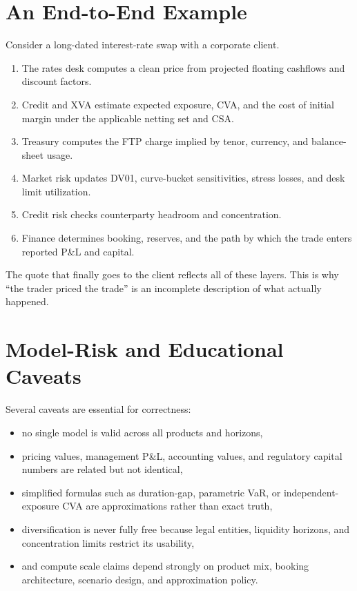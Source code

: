 \documentclass{apex_mdd}
\begin{document}
\section{An End-to-End Example}

Consider a long-dated interest-rate swap with a corporate client.
\begin{enumerate}
  \item The rates desk computes a clean price from projected floating cashflows and discount factors.
  \item Credit and XVA estimate expected exposure, CVA, and the cost of initial margin under the applicable netting set and CSA.
  \item Treasury computes the FTP charge implied by tenor, currency, and balance-sheet usage.
  \item Market risk updates DV01, curve-bucket sensitivities, stress losses, and desk limit utilization.
  \item Credit risk checks counterparty headroom and concentration.
  \item Finance determines booking, reserves, and the path by which the trade enters reported P\&L and capital.
\end{enumerate}

The quote that finally goes to the client reflects all of these layers. This is why ``the trader priced the trade'' is an incomplete description of what actually happened.

\section{Model-Risk and Educational Caveats}

Several caveats are essential for correctness:
\begin{itemize}
  \item no single model is valid across all products and horizons,
  \item pricing values, management P\&L, accounting values, and regulatory capital numbers are related but not identical,
  \item simplified formulas such as duration-gap, parametric VaR, or independent-exposure CVA are approximations rather than exact truth,
  \item diversification is never fully free because legal entities, liquidity horizons, and concentration limits restrict its usability,
  \item and compute scale claims depend strongly on product mix, booking architecture, scenario design, and approximation policy.
\end{itemize}
\end{document}
